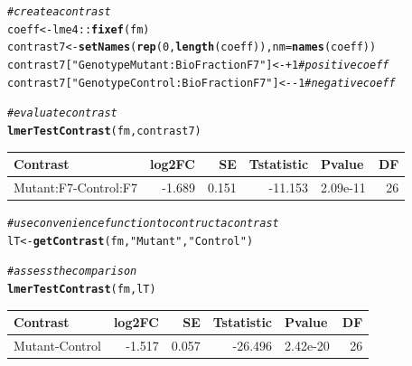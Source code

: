 \documentclass[11pt]{elife}\usepackage[]{graphicx}\usepackage[]{color}
\makeatletter
\newcommand{\hlnum}[1]{\textcolor[rgb]{0.686,0.059,0.569}{#1}}%
\newcommand{\hlstr}[1]{\textcolor[rgb]{0.192,0.494,0.8}{#1}}%
\newcommand{\hlcom}[1]{\textcolor[rgb]{0.678,0.584,0.686}{\textit{#1}}}%
\newcommand{\hlopt}[1]{\textcolor[rgb]{0,0,0}{#1}}%
\newcommand{\hlstd}[1]{\textcolor[rgb]{0.345,0.345,0.345}{#1}}%
\newcommand{\hlkwb}[1]{\textcolor[rgb]{0.69,0.353,0.396}{#1}}%
\newcommand{\hlkwc}[1]{\textcolor[rgb]{0.333,0.667,0.333}{#1}}%
\newcommand{\hlkwd}[1]{\textcolor[rgb]{0.737,0.353,0.396}{\textbf{#1}}}%
\newenvironment{kframe}{%
 \def\at@end@of@kframe{}%
 \ifinner\ifhmode%
  \def\at@end@of@kframe{\end{minipage}}%
  \begin{minipage}{\columnwidth}%
 \fi\fi%
 \def\FrameCommand##1{\hskip\@totalleftmargin \hskip-\fboxsep
 \colorbox{shadecolor}{##1}\hskip-\fboxsep
     \hskip-\linewidth \hskip-\@totalleftmargin \hskip\columnwidth}%
 \MakeFramed {\advance\hsize-\width
   \@totalleftmargin\z@ \linewidth\hsize
   \@setminipage}}%
 {\par\unskip\endMakeFramed%
 \at@end@of@kframe}
\newenvironment{knitrout}{}{} %
\makeatother
\begin{document}
\begin{knitrout}
\color{fgcolor}\begin{kframe}
\begin{alltt}
\hlcom{# create a contrast}
\hlstd{coeff} \hlkwb{<-} \hlstd{lme4}\hlopt{::}\hlkwd{fixef}\hlstd{(fm)}
\hlstd{contrast7} \hlkwb{<-} \hlkwd{setNames}\hlstd{(}\hlkwd{rep}\hlstd{(}\hlnum{0}\hlstd{,}\hlkwd{length}\hlstd{(coeff)),} \hlkwc{nm} \hlstd{=} \hlkwd{names}\hlstd{(coeff))}
\hlstd{contrast7[}\hlstr{"GenotypeMutant:BioFractionF7"}\hlstd{]} \hlkwb{<-} \hlopt{+}\hlnum{1} \hlcom{# positive coeff}
\hlstd{contrast7[}\hlstr{"GenotypeControl:BioFractionF7"}\hlstd{]} \hlkwb{<-} \hlopt{-}\hlnum{1} \hlcom{# negative coeff}

\hlcom{# evaluate contrast}
\hlkwd{lmerTestContrast}\hlstd{(fm, contrast7)}
\end{alltt}
\end{kframe}
\end{knitrout}

\begin{knitrout}
\color{fgcolor}
\begin{tabular}{l|r|r|r|l|r}
\hline
Contrast & log2FC & SE & Tstatistic & Pvalue & DF\\
\hline
Mutant:F7-Control:F7 & -1.689 & 0.151 & -11.153 & 2.09e-11 & 26\\
\hline
\end{tabular}


\end{knitrout}

\begin{knitrout}
\color{fgcolor}\begin{kframe}
\begin{alltt}
\hlcom{# use convenience function to contruct a contrast}
\hlstd{lT} \hlkwb{<-} \hlkwd{getContrast}\hlstd{(fm,} \hlstr{"Mutant"}\hlstd{,}\hlstr{"Control"}\hlstd{)}

\hlcom{# assess the comparison}
\hlkwd{lmerTestContrast}\hlstd{(fm, lT)}
\end{alltt}
\end{kframe}
\end{knitrout}

\begin{knitrout}
\color{fgcolor}
\begin{tabular}{l|r|r|r|l|r}
\hline
Contrast & log2FC & SE & Tstatistic & Pvalue & DF\\
\hline
Mutant-Control & -1.517 & 0.057 & -26.496 & 2.42e-20 & 26\\
\hline
\end{tabular}


\end{knitrout}
\end{document}
